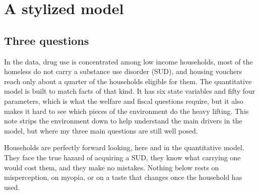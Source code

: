 \documentclass[10pt]{article}
\begin{document}
\section{A stylized model}\label{sec:stylized}

\subsection{Three questions}\label{sec:what}

In the data, drug use is concentrated among low income households, most of the
homeless do not carry a substance use disorder (SUD), and housing vouchers
reach only about a quarter of the households eligible for them. The quantitative
model is built to match facts of that kind. It has six state variables and
fifty four parameters, which is what the welfare and fiscal questions
require,
but it also makes it hard to see which pieces of the environment do the
heavy lifting. This note strips the environment down to help understand the
main drivers in the model, but where my three main questions are still well
posed.

Households are perfectly forward looking, here and in the quantitative model.
They face the true hazard of acquiring a SUD, they know what carrying one would
cost them, and they make no mistakes. Nothing below rests on misperception, on
myopia, or on a taste that changes once the household has used.
\end{document}
